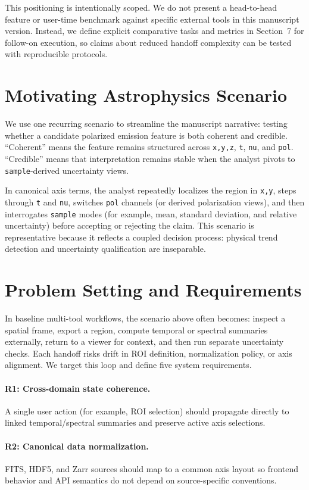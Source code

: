 \documentclass[11pt]{article}
\begin{document}
This positioning is intentionally scoped. We do not present a head-to-head feature or user-time benchmark against specific external tools in this manuscript version. Instead, we define explicit comparative tasks and metrics in Section~7 for follow-on execution, so claims about reduced handoff complexity can be tested with reproducible protocols.

\section{Motivating Astrophysics Scenario}
We use one recurring scenario to streamline the manuscript narrative: testing whether a candidate polarized emission feature is both coherent and credible. ``Coherent'' means the feature remains structured across \texttt{x,y,z}, \texttt{t}, \texttt{nu}, and \texttt{pol}. ``Credible'' means that interpretation remains stable when the analyst pivots to \texttt{sample}-derived uncertainty views.

In canonical axis terms, the analyst repeatedly localizes the region in \texttt{x,y}, steps through \texttt{t} and \texttt{nu}, switches \texttt{pol} channels (or derived polarization views), and then interrogates \texttt{sample} modes (for example, mean, standard deviation, and relative uncertainty) before accepting or rejecting the claim. This scenario is representative because it reflects a coupled decision process: physical trend detection and uncertainty qualification are inseparable.

\section{Problem Setting and Requirements}
In baseline multi-tool workflows, the scenario above often becomes: inspect a spatial frame, export a region, compute temporal or spectral summaries externally, return to a viewer for context, and then run separate uncertainty checks. Each handoff risks drift in ROI definition, normalization policy, or axis alignment. We target this loop and define five system requirements.

\paragraph{R1: Cross-domain state coherence.}
A single user action (for example, ROI selection) should propagate directly to linked temporal/spectral summaries and preserve active axis selections.

\paragraph{R2: Canonical data normalization.}
FITS, HDF5, and Zarr sources should map to a common axis layout so frontend behavior and API semantics do not depend on source-specific conventions.
\end{document}
